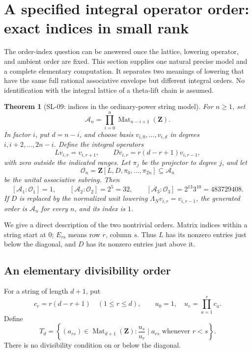 \documentclass[11pt,a4paper]{article}
\newtheorem{theorem}{Theorem}[section]
\theoremstyle{remark}
\begin{document}
\section{A specified integral operator order: exact indices in small rank}
\label{sec:order}

The order-index question can be answered once the lattice, lowering
operator, and ambient order are fixed.  This section supplies one
natural precise model and a complete elementary computation.  It
separates two meanings of lowering that have the same full rational
associative envelope but different integral orders.  No identification
with the integral lattice of a theta-lift chain is assumed.

\begin{theorem}[SL-09: indices in the ordinary-power string model]
\label{sl:order}
For \(n\ge1\), set
\[
\mathcal A_n=\prod_{i=0}^n
  \operatorname{Mat}_{n-i+1}(\mathbf Z).
\]
In factor \(i\), put \(d=n-i\), and choose basis
\(v_{i,0},\ldots,v_{i,d}\) in degrees
\(i,i+2,\ldots,2n-i\).  Define the integral operators
\[
L v_{i,r}=v_{i,r+1},\qquad
D v_{i,r}=r(d-r+1)v_{i,r-1},
\]
with zero outside the indicated ranges.  Let \(\pi_j\) be the
projector to degree \(j\), and let
\[
\mathcal O_n=\mathbf Z[L,D,\pi_0,\ldots,\pi_{2n}]
\subseteq\mathcal A_n
\]
be the unital associative subring.  Then
\[
[\mathcal A_1:\mathcal O_1]=1,\qquad
[\mathcal A_2:\mathcal O_2]=2^5=32,\qquad
[\mathcal A_3:\mathcal O_3]=2^{13}3^{10}=483729408.
\]
If \(D\) is replaced by the normalized unit lowering
\(\Lambda_N v_{i,r}=v_{i,r-1}\), the generated order is
\(\mathcal A_n\) for every \(n\), and its index is \(1\).
\end{theorem}

We give a direct description of the two nontrivial orders.  Matrix
indices within a string start at \(0\); \(E_{rs}\) means row \(r\),
column \(s\).  Thus \(L\) has its nonzero entries just below the
diagonal, and \(D\) has its nonzero entries just above it.

\subsection{An elementary divisibility order}

For a string of length \(d+1\), put
\[
c_r=r(d-r+1)\quad(1\le r\le d),\qquad
u_0=1,\quad u_r=\prod_{a=1}^r c_a.
\]
Define
\[
T_d=\left\{(a_{rs})\in\operatorname{Mat}_{d+1}(\mathbf Z):
       \frac{u_s}{u_r}\mid a_{rs}\text{ whenever }r<s\right\}.
\]
There is no divisibility condition on or below the diagonal.
\end{document}
